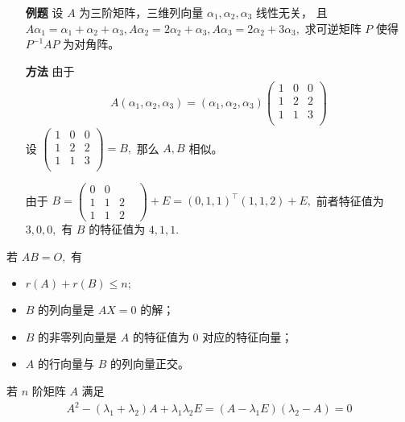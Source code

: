 \begin{enumerate}
    \item[\textbf{例题}] 设 $ A $ 为三阶矩阵，三维列向量 $ \alpha_1,\alpha_2,\alpha_3 $ 线性无关，
    且 $ A\alpha_1 = \alpha_1+\alpha_2+\alpha_3, 
    A\alpha_2 = 2\alpha_2+\alpha_3,
    A\alpha_3 = 2\alpha_2+3\alpha_3, $ 
    求可逆矩阵 $ P $ 使得 $ P^{-1}AP $ 为对角阵。
    \item[\textbf{方法}]
    由于
    \begin{equation*}
        \begin{aligned}
            A(\alpha_1,\alpha_2,\alpha_3) = (\alpha_1,\alpha_2,\alpha_3)
            \begin{pmatrix}
                1&0&0\\1&2&2\\1&1&3\\
            \end{pmatrix}
        \end{aligned}
    \end{equation*}
    设 $ \begin{pmatrix}
        1&0&0\\1&2&2\\1&1&3\\
    \end{pmatrix} = B, $ 
    那么 $ A,B $ 相似。

    由于 $ B = \begin{pmatrix}
        0&0&&\\1&1&2\\1&1&2
    \end{pmatrix}+E=(0,1,1)^\top(1,1,2) + E, $ 
    前者特征值为 $ 3,0,0, $ 有 $ B $ 的特征值为 $ 4,1,1. $ 
\end{enumerate}


若 $ AB = O, $ 有
\begin{itemize}
    \item $ r(A)+r(B)\leq n; $ 
    \item $ B $ 的列向量是 $ AX=0 $ 的解；
    \item $ B $ 的非零列向量是 $ A $ 的特征值为 $ 0 $ 对应的特征向量；
    \item $ A $ 的行向量与 $ B $ 的列向量正交。
\end{itemize}


若 $ n $ 阶矩阵 $ A $ 满足
\begin{equation*}
    \begin{aligned}
        A^2 - (\lambda_1+\lambda_2)A + \lambda_1\lambda_2E = 
        (A-\lambda_1E)(\lambda_2-A) = 0
    \end{aligned}
\end{equation*}

